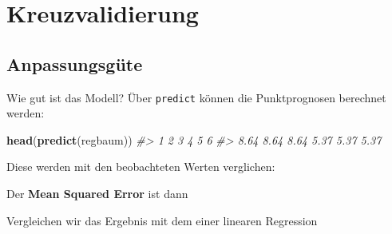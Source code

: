 \documentclass[12pt,]{book}
\newenvironment{Shaded}{\begin{snugshade}}{\end{snugshade}}
\newcommand{\KeywordTok}[1]{\textcolor[rgb]{0.13,0.29,0.53}{\textbf{{#1}}}}
\newcommand{\DecValTok}[1]{\textcolor[rgb]{0.00,0.00,0.81}{{#1}}}
\newcommand{\StringTok}[1]{\textcolor[rgb]{0.31,0.60,0.02}{{#1}}}
\newcommand{\CommentTok}[1]{\textcolor[rgb]{0.56,0.35,0.01}{\textit{{#1}}}}
\newcommand{\NormalTok}[1]{{#1}}
\begin{document}
\section{Kreuzvalidierung}\label{kreuzvalidierung}

\subsection{Anpassungsgüte}\label{anpassungsgute}

Wie gut ist das Modell? Über \texttt{predict} können die Punktprognosen
berechnet werden:

\begin{Shaded}
\begin{Highlighting}[]
\KeywordTok{head}\NormalTok{(}\KeywordTok{predict}\NormalTok{(regbaum))}
\CommentTok{#>    1    2    3    4    5    6 }
\CommentTok{#> 8.64 8.64 8.64 5.37 5.37 5.37}
\end{Highlighting}
\end{Shaded}

Diese werden mit den beobachteten Werten verglichen:

\begin{Shaded}
\end{Shaded}

Der \textbf{Mean Squared Error} ist dann

\begin{Shaded}
\end{Shaded}

Vergleichen wir das Ergebnis mit dem einer linearen Regression
\end{document}
